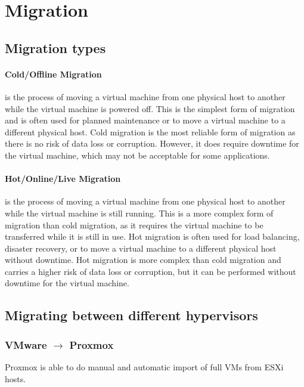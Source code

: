 \section{Migration}

\subsection{Migration types}

\paragraph{Cold/Offline Migration} is the process of moving a virtual machine from one physical host to another while the virtual machine is powered off. This is the simplest form of migration and is often used for planned maintenance or to move a virtual machine to a different physical host. Cold migration is the most reliable form of migration as there is no risk of data loss or corruption. However, it does require downtime for the virtual machine, which may not be acceptable for some applications.

\paragraph{Hot/Online/Live Migration} is the process of moving a virtual machine from one physical host to another while the virtual machine is still running. This is a more complex form of migration than cold migration, as it requires the virtual machine to be transferred while it is still in use. Hot migration is often used for load balancing, disaster recovery, or to move a virtual machine to a different physical host without downtime. Hot migration is more complex than cold migration and carries a higher risk of data loss or corruption, but it can be performed without downtime for the virtual machine.

\subsection{Migrating between different hypervisors}

\subsubsection{VMware $\rightarrow$ Proxmox}
Proxmox is able to do manual and automatic import of full VMs from ESXi hosts.

